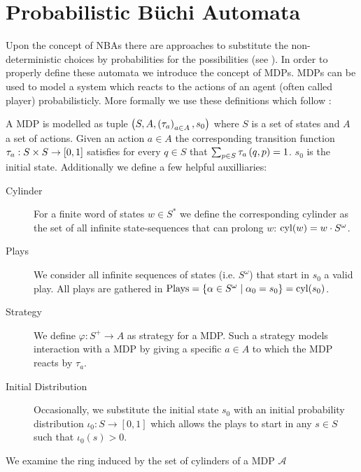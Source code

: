 \section{Probabilistic Büchi Automata}
Upon the concept of \acp{NBA} there are approaches to substitute the
non-deterministic choices by probabilities for the possibilities
(see \cite{RecOmeLangProbAuto,DecProblemsForProbAuto,Groesser}). In order to
properly define these automata we introduce the concept of \aclp{MDP}.
\aclp*{MDP} can be used to model a system which reacts to the actions of an
agent (often called player) probabilisticly.
More formally we use these definitions which follow \cite{RandAutoInfTrees}:
\begin{definition}
  A \acl*{MDP} is modelled as tuple
  $\left(S, A, \left(\tau_{a}\right)_{a\in A}, s_{0}\right)$ where $S$ is a set of states
  and $A$ a set of actions. Given an action $a\in A$ the corresponding
  transition function $\tau_{a}:S\times S\rightarrow \left[0,1\right]$ satisfies
  for every $q\in S$ that $\sum_{p\in S}\tau_{a}\left(q,p\right) = 1$.
  $s_{0}$ is the initial state. Additionally we define a few helpful
  auxilliaries:
  \begin{description}
    \item [Cylinder] For a finite word of states $w\in S^{*}$ we define the
      corresponding cylinder as the set of all infinite state-sequences
      that can prolong $w$: $\operatorname{cyl}(w) = w\cdot S^{\omega}$.
    \item [Plays] We consider all infinite sequences of states
      (i.e. $S^{\omega}$) that start in $s_{0}$ a valid play. All plays
      are gathered in $\operatorname{Plays} = \left\{
        \alpha\in S^{\omega}\mid \alpha_{0} = s_{0}\right\} = \operatorname{cyl}(s_{0})$.
    \item [Strategy] We define $\varphi:S^{+}\rightarrow A$ as strategy for
      a \ac{MDP}. Such a strategy models interaction with a \ac{MDP} by
      giving a specific $a\in A$ to which the \ac{MDP} reacts by $\tau_{a}$.
    \item [Initial Distribution] Occasionally, we substitute the initial state
      $s_{0}$ with an initial probability distribution
      $\iota_{0}:S\rightarrow[0,1]$ which allows the plays to start in any
      $s\in S$ such that $\iota_{0}(s) > 0$.
  \end{description}
  \label{def:mdp}
\end{definition}
We examine the ring induced by the set of cylinders of a \ac{MDP} $\mathcal{A}$
